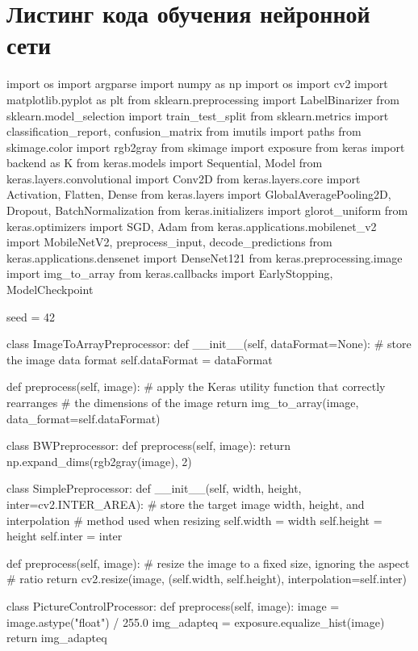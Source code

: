 \chapter*{Листинг кода обучения нейронной сети} \label{AppendixA}

\begin{python}
import os
import argparse
import numpy as np
import os
import cv2
import matplotlib.pyplot as plt
from sklearn.preprocessing import LabelBinarizer
from sklearn.model_selection import train_test_split
from sklearn.metrics import classification_report, confusion_matrix
from imutils import paths
from skimage.color import rgb2gray
from skimage import exposure
from keras import backend as K
from keras.models import Sequential, Model
from keras.layers.convolutional import Conv2D
from keras.layers.core import Activation, Flatten, Dense
from keras.layers import GlobalAveragePooling2D, Dropout, BatchNormalization
from keras.initializers import glorot_uniform
from keras.optimizers import SGD, Adam
from keras.applications.mobilenet_v2 import MobileNetV2, preprocess_input, decode_predictions
from keras.applications.densenet import DenseNet121
from keras.preprocessing.image import img_to_array
from keras.callbacks import EarlyStopping, ModelCheckpoint

seed = 42

class ImageToArrayPreprocessor:
    def __init__(self, dataFormat=None):
        # store the image data format
        self.dataFormat = dataFormat
        
    def preprocess(self, image):
        # apply the Keras utility function that correctly rearranges # the dimensions of the image
        return img_to_array(image, data_format=self.dataFormat)


class BWPreprocessor:
    def preprocess(self, image):
        return np.expand_dims(rgb2gray(image), 2)


class SimplePreprocessor:
    def __init__(self, width, height, inter=cv2.INTER_AREA):
        # store the target image width, height, and interpolation # method used when resizing
        self.width = width
        self.height = height
        self.inter = inter
        
    def preprocess(self, image):
        # resize the image to a fixed size, ignoring the aspect # ratio
        return cv2.resize(image, (self.width, self.height),
                                interpolation=self.inter)


class PictureControlProcessor:
    def preprocess(self, image):
        image = image.astype("float") / 255.0
        img_adapteq = exposure.equalize_hist(image)
        return img_adapteq



\end{python}
